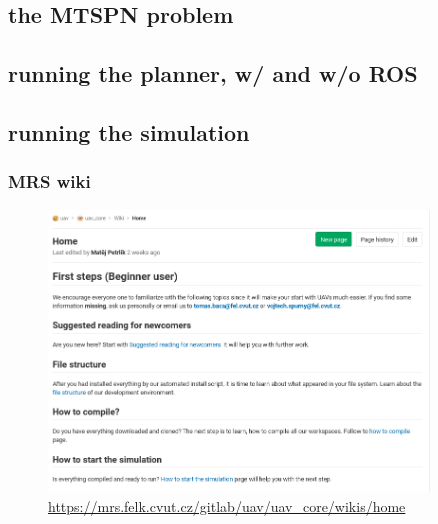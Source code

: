\documentclass{beamer}
\begin{document}
\subsection{the MTSPN problem}
\subsection{running the planner, w/ and w/o ROS}

\subsection{running the simulation}


\begin{frame}
  \frametitle{MRS wiki}

  \begin{figure}
    \caption*{\url{https://mrs.felk.cvut.cz/gitlab/uav/uav_core/wikis/home}}
    \includegraphics[width=0.9\textwidth]{./fig/wiki.png}
  \end{figure}

\end{frame}
\end{document}
